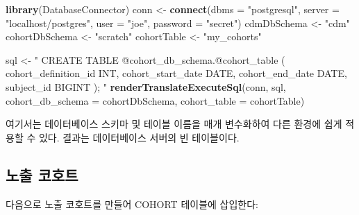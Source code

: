 \documentclass[10.5pt]{book}
\newenvironment{Shaded}{\begin{snugshade}}{\end{snugshade}}
\newcommand{\KeywordTok}[1]{\textcolor[rgb]{0.13,0.29,0.53}{\textbf{#1}}}
\newcommand{\DataTypeTok}[1]{\textcolor[rgb]{0.13,0.29,0.53}{#1}}
\newcommand{\StringTok}[1]{\textcolor[rgb]{0.31,0.60,0.02}{#1}}
\newcommand{\NormalTok}[1]{#1}
\theoremstyle{definition}
\theoremstyle{definition}
\theoremstyle{definition}
\theoremstyle{remark}
\begin{document}
\begin{Shaded}
\begin{Highlighting}[]
\KeywordTok{library}\NormalTok{(DatabaseConnector)}
\NormalTok{conn <-}\StringTok{ }\KeywordTok{connect}\NormalTok{(}\DataTypeTok{dbms =} \StringTok{"postgresql"}\NormalTok{,}
                \DataTypeTok{server =} \StringTok{"localhost/postgres"}\NormalTok{,}
                \DataTypeTok{user =} \StringTok{"joe"}\NormalTok{,}
                \DataTypeTok{password =} \StringTok{"secret"}\NormalTok{)}
\NormalTok{cdmDbSchema <-}\StringTok{ "cdm"}
\NormalTok{cohortDbSchema <-}\StringTok{ "scratch"}
\NormalTok{cohortTable <-}\StringTok{ "my_cohorts"}

\NormalTok{sql <-}\StringTok{ "}
\StringTok{CREATE TABLE @cohort_db_schema.@cohort_table (}
\StringTok{  cohort_definition_id INT,}
\StringTok{  cohort_start_date DATE,}
\StringTok{  cohort_end_date DATE,}
\StringTok{  subject_id BIGINT}
\StringTok{);}
\StringTok{"}
\KeywordTok{renderTranslateExecuteSql}\NormalTok{(conn, sql,}
                          \DataTypeTok{cohort_db_schema =}\NormalTok{ cohortDbSchema,}
                          \DataTypeTok{cohort_table =}\NormalTok{ cohortTable)}
\end{Highlighting}
\end{Shaded}

여기서는 데이터베이스 스키마 및 테이블 이름을 매개 변수화하여 다른
환경에 쉽게 적용할 수 있다. 결과는 데이터베이스 서버의 빈 테이블이다.

\subsection{노출 코호트}\label{-}

다음으로 노출 코호트를 만들어 COHORT 테이블에 삽입한다:
\end{document}
